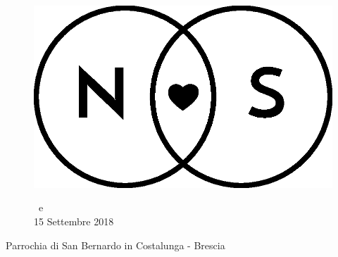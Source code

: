 \documentclass[11pt]{book}
\begin{document}
{%
\makeatletter
\let\strippt\strip@pt
\makeatother
\newcommand{\firstpageornament}{%
\unitlength=1mm 

\begin{picture}(0,0)%
\put(-19,13){\pgfornament[width=2cm]{37}}%
\put(87,13){%
\pgfornament[width=2cm,symmetry=v]{37}}%
\put(-19,-175){%
\pgfornament[width=2cm,symmetry=h]{37}}%
\put(87,-175){%
\pgfornament[width=2cm,symmetry=c]{37}}%
\end{picture}}%

}

\begin{center}
%


\begin{figure}
\vspace*{5cm}
\centering
\includegraphics[scale=0.3]{img/Logo_piccolo.eps}

\huge \NSposo \ e \NSposa\\
\large 15 Settembre 2018\\
\end{figure}
\normalsize

Parrochia di San Bernardo in Costalunga - Brescia

\end{center}
\end{document}
